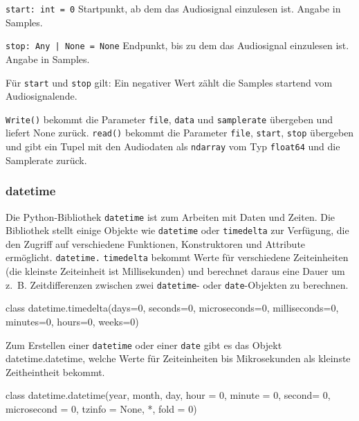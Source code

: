 \texttt{start: int = 0} Startpunkt, ab dem das Audiosignal einzulesen ist. Angabe in Samples.

\texttt{stop: Any | None = None} Endpunkt, bis zu dem das Audiosignal einzulesen ist. Angabe in Samples. 

Für \texttt{start} und \texttt{stop} gilt: Ein negativer Wert zählt die Samples startend vom Audiosignalende.

\lstinline{Write()} bekommt die Parameter  \texttt{file}, \texttt{data}  und \texttt{samplerate} übergeben und liefert None zurück.
\lstinline{read()} bekommt die Parameter  \texttt{file},  \texttt{start}, \texttt{stop} übergeben und gibt ein Tupel mit den Audiodaten als \texttt{ndarray} vom Typ \texttt{float64} und die Samplerate zurück.




\subsubsection{datetime}
\label{subsubsec:datetime}

Die Python-Bibliothek \texttt{datetime} ist zum Arbeiten mit Daten und Zeiten. %
Die Bibliothek stellt einige Objekte wie \texttt{datetime} oder \texttt{timedelta} zur Verfügung, die den Zugriff auf verschiedene Funktionen, Konstruktoren und Attribute ermöglicht. 
\texttt{datetime.} \texttt{timedelta} bekommt Werte für verschiedene Zeiteinheiten (die kleinste Zeiteinheit ist Millisekunden) und berechnet daraus eine Dauer um z.~B. Zeitdifferenzen zwischen zwei \texttt{datetime}- oder \texttt{date}-Objekten zu berechnen.

\begin{python}
    class datetime.timedelta(days=0, seconds=0, microseconds=0, milliseconds=0, minutes=0, hours=0, weeks=0)
\end{python}
            
Zum Erstellen einer \texttt{datetime} oder einer \texttt{date} gibt es das Objekt datetime.datetime, welche Werte für Zeiteinheiten bis Mikrosekunden als kleinste Zeitheintheit bekommt.

\begin{python}
    class datetime.datetime(year, month, day, hour = 0, minute = 0, second= 0, microsecond = 0, tzinfo = None, *, fold = 0)
\end{python}



